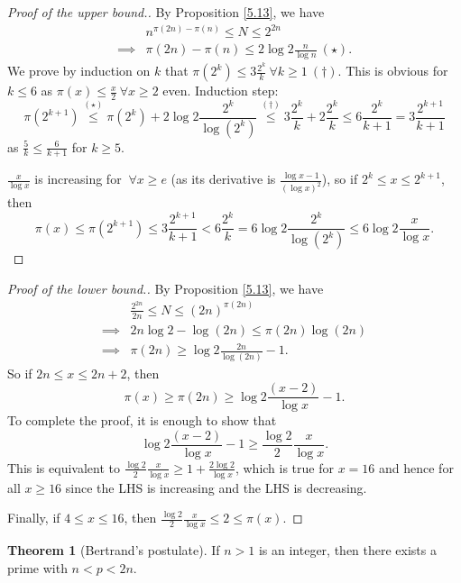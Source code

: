 \documentclass{article}
\theoremstyle{definition}
\newtheorem{theorem}{Theorem}[section]
\begin{document}
\begin{proof}[Proof of the upper bound.]
    By Proposition \ref{5.13}, we have 
    \begin{align*}
        &n^{\pi(2n)-\pi(n)} \le N \le 2^{2n} \\
        \implies &\pi(2n)-\pi(n) \le 2 \log 2 \frac{n}{\log n} ~(\star).
    \end{align*}
    We prove by induction on $k$ that $\pi(2^k) \le 3 \frac{2^k}{k} ~\forall k\ge 1 ~(\dagger)$. This is obvious for $k\le 6$ as $\pi(x)\le \frac{x}{2} ~\forall x\ge 2$ even. Induction step: $$\pi(2^{k+1}) \stackrel{(\star)}{\le} \pi(2^k) + 2\log 2 \frac{2^k}{\log(2^k)} \stackrel{(\dagger)}{\le} 3\frac{2^k}{k} + 2\frac{2^k}{k} \le 6 \frac{2^k}{k+1} = 3\frac{2^{k+1}}{k+1}$$
    as $\frac{5}{k}\le \frac{6}{k+1}$ for $k\ge 5$.
    \vspace{1mm}
    
    $\frac{x}{\log x}$ is increasing for $~\forall x \ge e$ (as its derivative is $\frac{\log x-1}{(\log x)^2}$), so if $2^k\le x \le 2^{k+1}$, then 
    \[
    \pi(x) \le \pi(2^{k+1}) \le 3\frac{2^{k+1}}{k+1} < 6\frac{2^k}{k} = 6\log 2 \frac{2^k}{\log(2^k)}\le 6 \log 2 \frac{x}{\log x}.
    \]
\end{proof}
\begin{proof}[Proof of the lower bound.]
    By Proposition \ref{5.13}, we have 
    \begin{align*}
    &\frac{2^{2n}}{2n} \le N \le  (2n)^{\pi(2n)} \\
    \implies &2n \log 2 - \log(2n) \le \pi(2n) \log(2n) \\
    \implies &\pi(2n) \ge \log 2 \frac{2n}{\log(2n)} -1.
    \end{align*}
    So if $2n\le x\le 2n+2$, then $$\pi(x) \ge \pi(2n) \ge \log 2 \frac{(x-2)}{\log x}-1.$$
    To complete the proof, it is enough to show that \[
    \log 2 \frac{(x-2)}{\log x} - 1 \ge \frac{\log 2}{2} \frac{x}{\log x}.
    \]
    This is equivalent to $\frac{\log 2}{2}\frac{x}{\log x}\ge 1 + \frac{2\log2}{\log x}$, which is true for $x=16$ and hence for all $x\ge 16$ since the LHS is increasing and the LHS is decreasing.
    \vspace{1mm}
    
    Finally, if $4\le x\le 16$, then $\frac{\log 2}{2}\frac{x}{\log x} \le 2 \le \pi(x)$.
\end{proof}
\begin{theorem}[Bertrand's postulate]
    If $n>1$ is an integer, then there exists a prime with $n<p<2n$.
\end{theorem}
\end{document}
